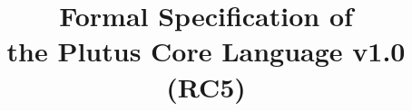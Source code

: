 \documentclass[conference]{IEEEtran}
\begin{document}
%
\title{Formal Specification of\\the Plutus Core Language v1.0 (RC5)}











% 








\maketitle
\end{document}
